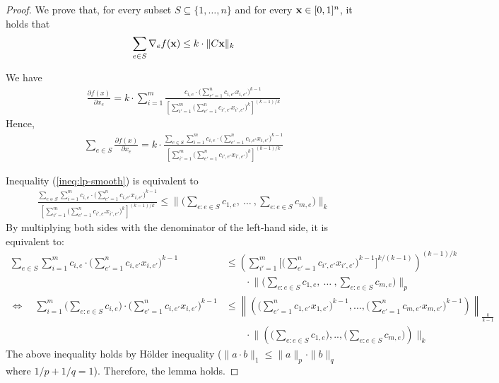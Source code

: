 \begin{proof}
We prove that, for every subset $S \subseteq \{1, \ldots, n\}$ and for every $\mathbf{x} \in [0,1]^{n}$, it holds that
%
\begin{align}	\label{ineq:lp-smooth}
\sum_{e \in S} \nabla_{e} f(\mathbf{x}) \leq  k \cdot \|C \mathbf{x}\|_{k} 
\end{align}


We have
%
\begin{align*}
\frac{\partial f(x)}{\partial x_{e}}
= k \cdot \sum_{i = 1}^{m} \frac{c_{i,e} \cdot \bigl( \sum_{e' = 1}^{n} c_{i,e'} x_{i,e'} \bigr)^{k-1} }{ \left[ \sum_{i' = 1}^{m} 
		\bigl( \sum_{e'= 1}^{n} c_{i',e'} x_{i',e'} \bigr)^{k} \right]^{(k-1)/k}}
\end{align*}
Hence,
\begin{align*}
\sum_{e \in S} \frac{\partial f(x)}{\partial x_{e}}
= k \cdot \frac{ \sum_{e \in S} \sum_{i = 1}^{m} c_{i,e} \cdot \bigl( \sum_{e' = 1}^{n} c_{i,e'} x_{i,e'} \bigr)^{k-1} }{ \left[ \sum_{i' = 1}^{m} \bigl( \sum_{e'= 1}^{n} c_{i',e'} x_{i',e'} \bigr)^{k} \right]^{(k-1)/k}}
\end{align*}

Inequality (\ref{ineq:lp-smooth}) is equivalent to
\begin{align*}
\frac{ \sum_{e \in S} \sum_{i = 1}^{m} c_{i,e} \cdot \bigl( \sum_{e' = 1}^{n} c_{i,e'} x_{i,e'} \bigr)^{k-1} }{ \left[ \sum_{i' = 1}^{m} \bigl( \sum_{e'= 1}^{n} c_{i',e'} x_{i',e'} \bigr)^{k} \right]^{(k-1)/k}}
	\leq   \biggl \| \biggl( \sum_{e: e \in S} c_{1,e},\ \ldots\ , \sum_{e: e \in S} c_{m,e}  \biggr) \biggr \|_{k}
\end{align*}
%
By multiplying both sides with the denominator of the left-hand side, it is equivalent to:
%
\begin{align*}
\sum_{e \in S} \sum_{i = 1}^{m} c_{i,e} \cdot \bigl( \sum_{e' = 1}^{n} c_{i,e'} x_{i,e'} \bigr)^{k-1}  
&\leq
        \left ( \sum_{i'=1}^{m} \biggl [ \biggl( \sum_{e'= 1}^{n} c_{i',e'} x_{i',e'} \biggr)^{k-1} \biggr ]^{k/(k-1)} \right )^{(k-1)/k} \\
        			& \qquad \cdot \biggl \| \biggl( \sum_{e: e \in S} c_{1,e}, \ \ldots\ , \sum_{e: e \in S} c_{m,e}  \biggr) \biggr \|_{p} \\
 \Leftrightarrow \quad  \sum_{i=1}^{m} \biggl( \sum_{e: e \in S} c_{i,e} \biggr) \cdot \biggl( \sum_{e'=1}^{n} c_{i,e'} x_{i,e'} \biggr)^{k-1} 
 &\leq
        \left \| \left( \biggl( \sum_{e'=1}^{n} c_{1,e'} x_{1,e'} \biggr)^{k-1}, \ldots, \biggl( \sum_{e'=1}^{n} c_{m,e'} x_{m,e'} \biggr)^{k-1} \right)   \right \|_{\frac{k}{k-1}} \\
        		& \qquad \cdot \biggl \| \left( \biggl(\sum_{e: e \in S} c_{1,e} \biggr) ,.., \biggl( \sum_{e: e \in S} c_{m,e}\biggr)  \right) \biggr \|_{k}
\end{align*}
The above inequality holds by H\"older inequality ($\| a \cdot b\|_{1} \leq \| a \|_{p} \cdot \| b \|_{q}$ where $1/p + 1/q = 1$).
Therefore, the lemma holds.
\end{proof}

